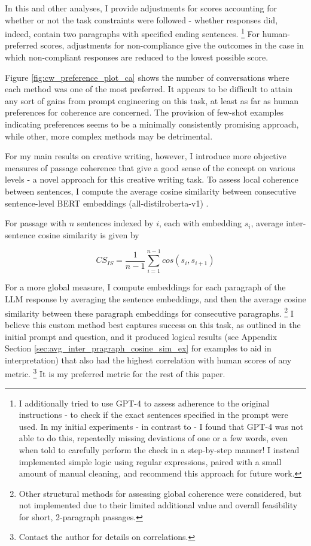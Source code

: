 \documentclass[11pt]{article}
\begin{document}
In this and other analyses, I provide adjustments for scores accounting for whether or not the task constraints were followed - whether responses did, indeed, contain two paragraphs with specified ending sentences. \footnote{I additionally tried to use GPT-4 to assess adherence to the original instructions - to check if the exact sentences specified in the prompt were used. In my initial experiments - in contrast to \citealp{yao_tree_2023} - I found that GPT-4 was not able to do this, repeatedly missing deviations of one or a few words, even when told to carefully perform the check in a step-by-step manner! I instead implemented simple logic using regular expressions, paired with a small amount of manual cleaning, and recommend this approach for future work.} For human-preferred scores, adjustments for non-compliance give the outcomes in the case in which non-compliant responses are reduced to the lowest possible score.

Figure \ref{fig:cw_preference_plot_ca} shows the number of conversations where each method was one of the most preferred. It appears to be difficult to attain any sort of gains from prompt engineering on this task, at least as far as human preferences for coherence are concerned. The provision of few-shot examples indicating preferences seems to be a minimally consistently promising approach, while other, more complex methods may be detrimental.

For my main results on creative writing, however, I introduce more objective measures of passage coherence that give a good sense of the concept on various levels - a novel approach for this creative writing task. To assess local coherence between sentences, I compute the average cosine similarity between consecutive sentence-level BERT embeddings (all-distilroberta-v1) \cite{landauer_introduction_1998, noauthor_sentence-transformersall-distilroberta-v1_nodate}. 

For passage with $n$ sentences indexed by $i$, each with embedding $s_{i}$, average inter-sentence cosine similarity is given by

$$CS_{IS}=\frac{1}{n-1}\sum_{i=1}^{n-1}cos(s_{i},s_{i+1})$$

For a more global measure, I compute embeddings for each paragraph of the LLM response by averaging the sentence embeddings, and then the average cosine similarity between these paragraph embeddings for consecutive paragraphs. \footnote{Other structural methods for assessing global coherence were considered, but not implemented due to their limited additional value and overall feasibility for short, 2-paragraph passages.} I believe this custom method best captures success on this task, as outlined in the initial prompt and question, and it produced logical results (see Appendix Section \ref{sec:avg_inter_pragraph_cosine_sim_ex} for examples to aid in interpretation) that also had the highest correlation with human scores of any metric. \footnote{Contact the author for details on correlations.} It is my preferred metric for the rest of this paper. 
\end{document}
